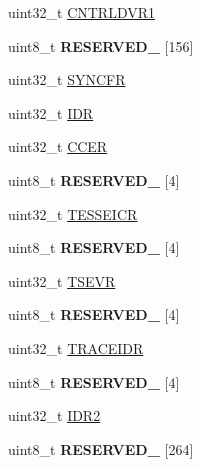 \begin{DoxyCompactItemize}
\item 
uint32\+\_\+t \hyperlink{struct_e_t_m___mem_map_aa83f53db92961a712ee31a8b810f0fad}{C\+N\+T\+R\+L\+D\+V\+R1}
\item 
\hypertarget{struct_e_t_m___mem_map_a38e2061e881d7fab2a46b12b5c20ca02}{}uint8\+\_\+t {\bfseries R\+E\+S\+E\+R\+V\+E\+D\+\_} \mbox{[}156\mbox{]}\label{struct_e_t_m___mem_map_a38e2061e881d7fab2a46b12b5c20ca02}

\item 
uint32\+\_\+t \hyperlink{struct_e_t_m___mem_map_af01a13d412cdc4037d95e27ac51c64bd}{S\+Y\+N\+C\+F\+R}
\item 
uint32\+\_\+t \hyperlink{struct_e_t_m___mem_map_a86a9b1a2c070dbd2726e755884425de5}{I\+D\+R}
\item 
uint32\+\_\+t \hyperlink{struct_e_t_m___mem_map_a94aeaa48b0535d838c20834618b26f4a}{C\+C\+E\+R}
\item 
\hypertarget{struct_e_t_m___mem_map_ac37173ffe4f59cd3b60eb00bcabd2c1c}{}uint8\+\_\+t {\bfseries R\+E\+S\+E\+R\+V\+E\+D\+\_} \mbox{[}4\mbox{]}\label{struct_e_t_m___mem_map_ac37173ffe4f59cd3b60eb00bcabd2c1c}

\item 
uint32\+\_\+t \hyperlink{struct_e_t_m___mem_map_a81f0d20c0c8efb46c6c06bcc30c5947e}{T\+E\+S\+S\+E\+I\+C\+R}
\item 
\hypertarget{struct_e_t_m___mem_map_a75c2d69790515fdf92d17b8c3bacd474}{}uint8\+\_\+t {\bfseries R\+E\+S\+E\+R\+V\+E\+D\+\_} \mbox{[}4\mbox{]}\label{struct_e_t_m___mem_map_a75c2d69790515fdf92d17b8c3bacd474}

\item 
uint32\+\_\+t \hyperlink{struct_e_t_m___mem_map_ad30bdaff018bc7d3b586ce0ca41dfd9b}{T\+S\+E\+V\+R}
\item 
\hypertarget{struct_e_t_m___mem_map_ac0efdcc92aa1da07b05d9b93c69f2b85}{}uint8\+\_\+t {\bfseries R\+E\+S\+E\+R\+V\+E\+D\+\_} \mbox{[}4\mbox{]}\label{struct_e_t_m___mem_map_ac0efdcc92aa1da07b05d9b93c69f2b85}

\item 
uint32\+\_\+t \hyperlink{struct_e_t_m___mem_map_a9f0f88f9e4c2bbb77d22f216cce40e7a}{T\+R\+A\+C\+E\+I\+D\+R}
\item 
\hypertarget{struct_e_t_m___mem_map_ae141a843181454cd155a05c904852c1b}{}uint8\+\_\+t {\bfseries R\+E\+S\+E\+R\+V\+E\+D\+\_} \mbox{[}4\mbox{]}\label{struct_e_t_m___mem_map_ae141a843181454cd155a05c904852c1b}

\item 
uint32\+\_\+t \hyperlink{struct_e_t_m___mem_map_a584ac31c6dcec464f98ceece5b76d1f6}{I\+D\+R2}
\item 
\hypertarget{struct_e_t_m___mem_map_a62a0e57c2eff8ef60130b8bbe396eaaf}{}uint8\+\_\+t {\bfseries R\+E\+S\+E\+R\+V\+E\+D\+\_} \mbox{[}264\mbox{]}\label{struct_e_t_m___mem_map_a62a0e57c2eff8ef60130b8bbe396eaaf}


\end{DoxyCompactItemize}
